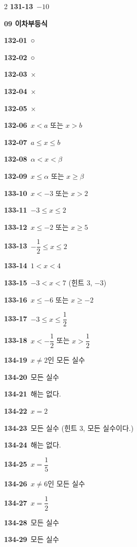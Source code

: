 \documentclass[10pt,a4paper]{article}
\begin{document}
\begin{multicols}{2}
\noindent\textbf{131-13}\ $-10$\par
\noindent\textbf{09 이차부등식}\par\smallskip
\noindent\textbf{132-01}\ ○\par
\noindent\textbf{132-02}\ ○\par
\noindent\textbf{132-03}\ ×\par
\noindent\textbf{132-04}\ ×\par
\noindent\textbf{132-05}\ ×\par
\noindent\textbf{132-06}\ $x<a$ 또는 $x>b$\par
\noindent\textbf{132-07}\ $a\le x\le b$\par
\noindent\textbf{132-08}\ $\alpha<x<\beta$\par
\noindent\textbf{132-09}\ $x\le\alpha$ 또는 $x\ge\beta$\par
\noindent\textbf{133-10}\ $x<-3$ 또는 $x>2$\par
\noindent\textbf{133-11}\ $-3\le x\le 2$\par
\noindent\textbf{133-12}\ $x\le -2$ 또는 $x\ge 5$\par
\noindent\textbf{133-13}\ $-\dfrac{1}{2}\le x\le 2$\par
\noindent\textbf{133-14}\ $1<x<4$\par
\noindent\textbf{133-15}\ $-3<x<7$ (힌트 $3$, $-3$)\par
\noindent\textbf{133-16}\ $x\le -6$ 또는 $x\ge -2$\par
\noindent\textbf{133-17}\ $-3\le x\le\dfrac{1}{2}$\par
\noindent\textbf{133-18}\ $x<-\dfrac{1}{2}$ 또는 $x>\dfrac{1}{2}$\par
\noindent\textbf{134-19}\ $x\ne 2$인 모든 실수\par
\noindent\textbf{134-20}\ 모든 실수\par
\noindent\textbf{134-21}\ 해는 없다.\par
\noindent\textbf{134-22}\ $x=2$\par
\noindent\textbf{134-23}\ 모든 실수 (힌트 $3$, 모든 실수이다.)\par
\noindent\textbf{134-24}\ 해는 없다.\par
\noindent\textbf{134-25}\ $x=\dfrac{1}{5}$\par
\noindent\textbf{134-26}\ $x\ne 6$인 모든 실수\par
\noindent\textbf{134-27}\ $x=\dfrac{1}{2}$\par
\noindent\textbf{134-28}\ 모든 실수\par
\noindent\textbf{134-29}\ 모든 실수\par

\end{multicols}
\end{document}
